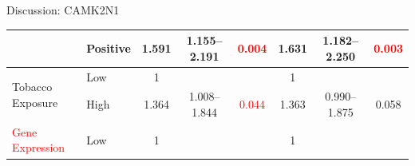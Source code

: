 \documentclass[paperwidth=78cm,paperheight=110cm,portrait]{baposter}
\begin{document}
\begin{poster}
\begin{posterbox}[name=problems,column=2,below=install]{Discussion: CAMK2N1}
\begin{center}
{\begin{tabular}{|l|l|c|c|c|c|c|c|}
\cline{2-8}
                                        & Positive                                                                            & 1.591                                                                          & 1.155--2.191                                                                   & \textcolor{red}{0.004}                                                        & 1.631                                                                          & 1.182--2.250                                                                   & \textcolor{red}{0.003}                                                         \\ 
\hline
\multirow{2}{*}{Tobacco Exposure}       & {\cellcolor[rgb]{0.62,0.812,0.878}}Low                                              & {\cellcolor[rgb]{0.62,0.812,0.878}}1                                           & {\cellcolor[rgb]{0.62,0.812,0.878}}                                           & {\cellcolor[rgb]{0.62,0.812,0.878}}                                           & {\cellcolor[rgb]{0.62,0.812,0.878}}1                                           & {\cellcolor[rgb]{0.62,0.812,0.878}}                                           & {\cellcolor[rgb]{0.62,0.812,0.878}}                                            \\ 
\cline{2-8}
                                        & High                                                                                & 1.364                                                                          & 1.008--1.844                                                                   & \textcolor{red}{0.044}                                                        & 1.363                                                                          & 0.990--1.875                                                                   & 0.058                                                                          \\ 
\hline
\multirow{2}{*}{\textcolor{red}{Gene Expression}}                & {\cellcolor[rgb]{0.62,0.812,0.878}}Low                                              & {\cellcolor[rgb]{0.62,0.812,0.878}}1                                           & {\cellcolor[rgb]{0.62,0.812,0.878}}                                           & {\cellcolor[rgb]{0.62,0.812,0.878}}                                           & {\cellcolor[rgb]{0.62,0.812,0.878}}1                                           & {\cellcolor[rgb]{0.62,0.812,0.878}}                                           & {\cellcolor[rgb]{0.62,0.812,0.878}}                                            \\ 

\end{tabular}}
\end{center}
\end{posterbox}
\end{poster}
\end{document}

